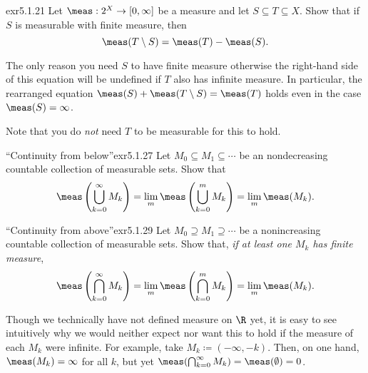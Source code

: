 \begin{exr}{}{exr5.1.21}
Let $\meas :2^X\rightarrow [0,\infty ]$ be a measure and let $S\subseteq T\subseteq X$.  Show that if $S$ is measurable with finite measure, then
\begin{equation}
\meas (T\setminus S)=\meas (T)-\meas (S).
\end{equation}
\begin{rmk}
The only reason you need $S$ to have finite measure otherwise the right-hand side of this equation will be undefined if $T$ also has infinite measure.  In particular, the rearranged equation $\meas (S)+\meas (T\setminus S)=\meas (T)$ holds even in the case $\meas (S)=\infty$.
\end{rmk}
\begin{rmk}
Note that you do \emph{not} need $T$ to be measurable for this to hold.
\end{rmk}
\end{exr}
\begin{exr}{``Continuity from below''}{exr5.1.27}
Let $M_0\subseteq M_1\subseteq \cdots$ be an nondecreasing countable collection of measurable sets.  Show that
\begin{equation}
\meas \left( \bigcup _{k=0}^\infty M_k\right) =\lim _m\meas \left( \bigcup _{k=0}^mM_k\right) =\lim _m\meas (M_k).
\end{equation}
\end{exr}
\begin{exr}{``Continuity from above''}{exr5.1.29}
Let $M_0\supseteq M_1\supseteq \cdots$ be a nonincreasing countable collection of measurable sets.  Show that, \emph{if at least one $M_k$ has finite measure},
\begin{equation}
\meas \left( \bigcap _{k=0}^\infty M_k\right) =\lim _m\meas \left( \bigcap _{k=0}^mM_k\right) =\lim _m\meas (M_k).
\end{equation}
\begin{rmk}
Though we technically have not defined measure on $\R$ yet, it is easy to see intuitively why we would neither expect nor want this to hold if the measure of each $M_k$ were infinite.  For example, take $M_k\coloneqq (-\infty ,-k)$.  Then, on one hand, $\meas (M_k)=\infty$ for all $k$, but yet $\meas (\bigcap _{k=0}^\infty M_k)=\meas (\emptyset )=0$.
\end{rmk}
\end{exr}

